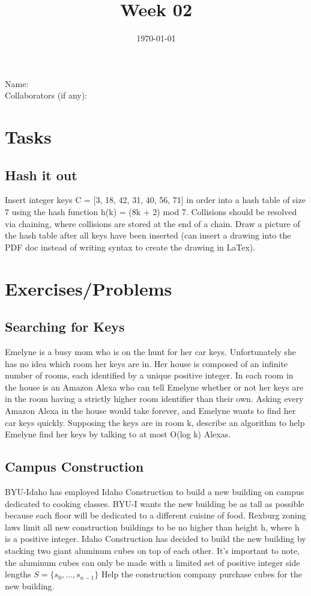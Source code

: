 \documentclass[12pt]{amsart}
\title{Week 02}
\date{\today}
\begin{document}
\maketitle


Name: 
\\

Collaborators (if any): 

\section{Tasks}

\subsection{Hash it out}

Insert integer keys C = [3, 18, 42, 31, 40, 56, 71] in order into a hash table of size
7 using the hash function h(k) = (8k + 2) mod 7. Collisions should be resolved via chaining,
where collisions are stored at the end of a chain. Draw a picture of the hash table after all keys
have been inserted (can insert a drawing into the PDF doc instead of writing syntax to create the drawing in LaTex).


\section{Exercises/Problems}
\subsection{Searching for Keys}
Emelyne is a busy mom who is on the hunt for her car keys. Unfortunately she has no idea which room her keys are in. Her house is composed of an infinite number of rooms, each identified by a unique positive integer. In each room in the house is an Amazon Alexa who can tell Emelyne whether or not her keys are in the room having a strictly higher room identifier than their own. Asking every Amazon Alexa in the house would take forever, and Emelyne wants to find her car keys quickly. Supposing
the keys are in room k, describe an algorithm to help Emelyne find her keys by talking to at most O(log k) Alexas. 

\subsection{Campus Construction} 
BYU-Idaho has employed Idaho Construction to build a new building on campus dedicated to cooking classes. BYU-I wants the new building be as tall as possible because each floor will be dedicated to a different cuisine of food. Rexburg zoning laws limit all new construction buildings to be no higher than height h, where h is a positive integer. Idaho Construction has decided to build the new building by stacking two giant aluminum cubes on top of each other. It's important to note, the aluminum cubes can only be made with a limited set of positive integer side lengths ${S = \{s_0, ..., s_{n-1}\}}$ Help the construction company purchase cubes for the new building.
\\
\end{document}
